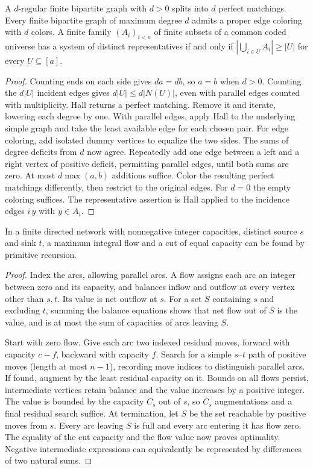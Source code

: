\begin{corollary}\label{result29}
A $d$-regular finite bipartite graph with $d>0$ splits into $d$ perfect matchings. Every finite bipartite graph of maximum degree $d$ admits a proper edge coloring with $d$ colors. A finite family $(A_i)_{i<a}$ of finite subsets of a common coded universe has a system of distinct representatives if and only if $|\bigcup_{i\in U} A_i|\ge |U|$ for every $U\subseteq[a]$.
\end{corollary}
\begin{proof}
Counting ends on each side gives $da=db$, so $a=b$ when $d>0$. Counting the $d|U|$ incident edges gives $d|U|\le d|N(U)|$, even with parallel edges counted with multiplicity. Hall returns a perfect matching. Remove it and iterate, lowering each degree by one. With parallel edges, apply Hall to the underlying simple graph and take the least available edge for each chosen pair. For edge coloring, add isolated dummy vertices to equalize the two sides. The sums of degree deficits from $d$ now agree. Repeatedly add one edge between a left and a right vertex of positive deficit, permitting parallel edges, until both sums are zero. At most $d\max(a,b)$ additions suffice. Color the resulting perfect matchings differently, then restrict to the original edges. For $d=0$ the empty coloring suffices. The representative assertion is Hall applied to the incidence edges $i\,y$ with $y\in A_i$.
\end{proof}

\begin{theorem}\label{result30}
In a finite directed network with nonnegative integer capacities, distinct source $s$ and sink $t$, a maximum integral flow and a cut of equal capacity can be found by primitive recursion.
\end{theorem}
\begin{proof}
Index the arcs, allowing parallel arcs. A flow assigns each arc an integer between zero and its capacity, and balances inflow and outflow at every vertex other than $s,t$. Its value is net outflow at $s$. For a set $S$ containing $s$ and excluding $t$, summing the balance equations shows that net flow out of $S$ is the value, and is at most the sum of capacities of arcs leaving $S$.

Start with zero flow. Give each arc two indexed residual moves, forward with capacity $c-f$, backward with capacity $f$. Search for a simple $s$--$t$ path of positive moves (length at most $n-1$), recording move indices to distinguish parallel arcs. If found, augment by the least residual capacity on it. Bounds on all flows persist, intermediate vertices retain balance and the value increases by a positive integer. The value is bounded by the capacity $C_s$ out of $s$, so $C_s$ augmentations and a final residual search suffice. At termination, let $S$ be the set reachable by positive moves from $s$. Every arc leaving $S$ is full and every arc entering it has flow zero. The equality of the cut capacity and the flow value now proves optimality. Negative intermediate expressions can equivalently be represented by differences of two natural sums.
\end{proof}

